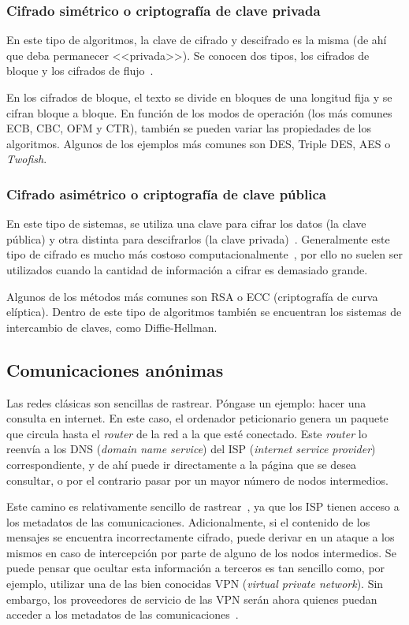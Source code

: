 \subsubsection{Cifrado simétrico o criptografía de clave privada}

En este tipo de algoritmos, la clave de cifrado y descifrado es la misma (de ahí que deba permanecer <<privada>>). Se conocen dos tipos, los cifrados de bloque y los cifrados de flujo~\cite{apuntesCybersec}.

En los cifrados de bloque, el texto se divide en bloques de una longitud fija y se cifran bloque a bloque. En función de los modos de operación (los más comunes ECB, CBC, OFM y CTR), también se pueden variar las propiedades de los algoritmos. Algunos de los ejemplos más comunes son DES, Triple DES, AES o \textit{Twofish}.

\subsubsection{Cifrado asimétrico o criptografía de clave pública}

En este tipo de sistemas, se utiliza una clave para cifrar los datos (la clave pública) y otra distinta para descifrarlos (la clave privada)~\cite{cifradoIBM}. Generalmente este tipo de cifrado es mucho más costoso computacionalmente~\cite{apuntesCybersec}, por ello no suelen ser utilizados cuando la cantidad de información a cifrar es demasiado grande. 

Algunos de los métodos más comunes son RSA o ECC (criptografía de curva elíptica). Dentro de este tipo de algoritmos también se encuentran los sistemas de intercambio de claves, como Diffie-Hellman.

\subsection{Comunicaciones anónimas}

Las redes clásicas son sencillas de rastrear. Póngase un ejemplo: hacer una consulta en internet. En este caso, el ordenador peticionario genera un paquete que circula hasta el \textit{router} de la red a la que esté conectado. Este \textit{router} lo reenvía a los DNS (\textit{domain name service}) del ISP (\textit{internet service provider}) correspondiente, y de ahí puede ir directamente a la página que se desea consultar, o por el contrario pasar por un mayor número de nodos intermedios.

Este camino es relativamente sencillo de rastrear~\cite{TorAndrea2022}, ya que los ISP tienen acceso a los metadatos de las comunicaciones. Adicionalmente, si el contenido de los mensajes se encuentra incorrectamente cifrado, puede derivar en un ataque a los mismos en caso de intercepción por parte de alguno de los nodos intermedios. Se puede pensar que ocultar esta información a terceros es tan sencillo como, por ejemplo, utilizar una de las bien conocidas VPN (\textit{virtual private network}). Sin embargo, los proveedores de servicio de las VPN serán ahora quienes puedan acceder a los metadatos de las comunicaciones~\cite{TorKeepCoding2022}.


